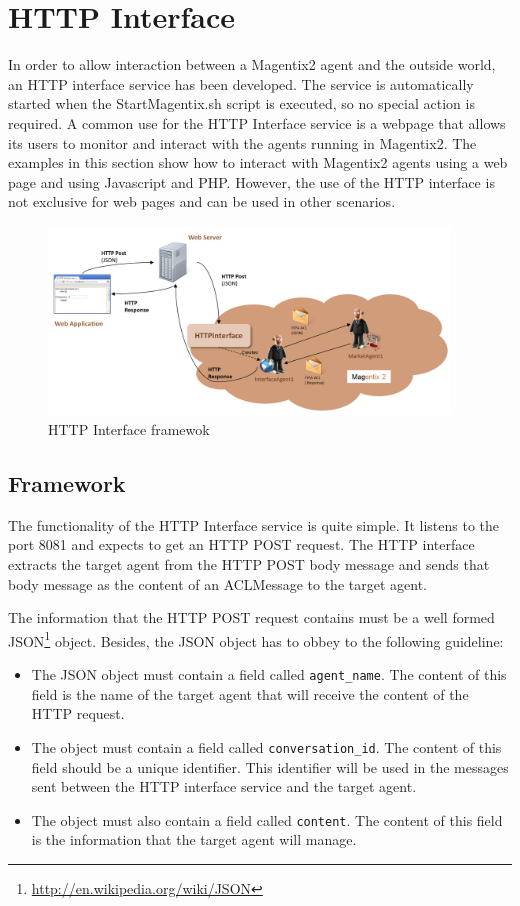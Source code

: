 \chapter{HTTP Interface}
In order to allow interaction between a Magentix2 agent and the outside world, an HTTP interface service has been developed. The service is automatically started when the StartMagentix.sh script is executed, so no special action is required. A common use for the HTTP Interface service is a webpage that allows its users to monitor and interact with the agents running in Magentix2. The examples in this section show how to interact with Magentix2 agents using a web page and using Javascript and PHP. However, the use of the HTTP interface is not exclusive for web pages and can be used in other scenarios.
\begin{figure}
	\centering
		\includegraphics[width=0.95\textwidth]{HTTPInterface/images/HTTPInterface.png}
	\caption{HTTP Interface framewok }
	\label{fig:HTTPInterface}
\end{figure}


\section{Framework}
The functionality of the HTTP Interface service is quite simple. It listens to the port 8081 and expects to get an HTTP POST request. The HTTP interface extracts the target agent from the HTTP POST body message and sends that body message as the content of an ACLMessage to the target agent. 

The information that the HTTP POST request contains must be a well formed JSON\footnote{\url{http://en.wikipedia.org/wiki/JSON}} object. Besides, the JSON object has to obbey to the following guideline:
\begin{itemize}
 \item The JSON object must contain a field called \texttt{agent\_name}. The content of this field is the name of the target agent that will receive the content of the HTTP request.
 \item The object must contain a field called \texttt{conversation\_id}. The content of this field should be a unique identifier. This identifier will be used in the messages sent between the HTTP interface service and the target agent.
 \item The object must also contain a field called \texttt{content}. The content of this field is the information that the target agent will manage.
\end{itemize}

